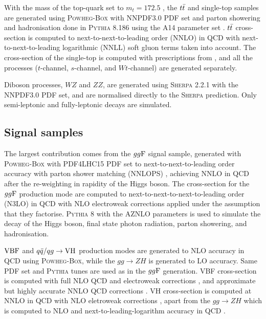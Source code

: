 With the mass of the top-quark set to $m_t = 172.5$ \GeV, the
$t\bar{t}$ and single-top samples are generated using
\textsc{Powheg-Box} \cite{powheg, Frixione_2007, Alioli_2010}
with NNPDF3.0 PDF set and parton showering and hadronisation
done in \textsc{Pythia} 8.186 using the A14 parameter set
\cite{ATL-PHYS-PUB-2014-021}. $t\bar{t}$ cross-section is
computed to next-to-next-to-leading order (NNLO) in
QCD with next-to-next-to-leading logarithmic
(NNLL) soft gluon terms taken into account. The cross-section
of the single-top is computed with prescriptions from
\cite{Kidonakis:2011wy, Kidonakis:2010ux}, and all the processes
($t$-channel, $s$-channel, and $Wt$-channel) are generated
separately.

Diboson processes, $WZ$ and $ZZ$, are generated using
\textsc{Sherpa} 2.2.1 with the NNPDF3.0 PDF set, and are normalised
directly to the \textsc{Sherpa} prediction. Only semi-leptonic
and fully-leptonic decays are simulated.

\subsection{Signal samples}

The largest contribution comes from the $gg\text{F}$ signal sample,
generated with \textsc{Powheg-Box} with PDF4LHC15 PDF set
to next-to-next-to-leading order accuracy with parton shower matching
(NNLOPS) \cite{Hamilton:2013fea}, achieving NNLO in QCD after
the re-weighting in rapidity of the Higgs boson. The cross-section
for the $gg\text{F}$ production mode are computed to
next-to-next-to-next-to-leading order (N3LO) \cite{Anastasiou:2016cez}
in QCD with NLO electroweak corrections applied
\cite{Aglietti:2004nj, Actis:2008ug} under the assumption that
they factorise. \textsc{Pythia} 8 with the AZNLO parameters
\cite{Aad:2014xaa} is used to simulate the decay
of the Higgs boson, final state photon radiation, parton
showering, and hadronisation. 

$\text{VBF}$ and $q\bar{q}/qg \rightarrow \text{VH}$ production modes are
generated to NLO accuracy in QCD using \textsc{Powheg-Box},
while the $gg \rightarrow ZH$ is generated to LO accuracy. Same
PDF set and \textsc{Pythia} tunes are used as in the $gg\text{F}$
generation. VBF cross-section is computed with full NLO QCD
and electroweak corrections \cite{Ciccolini:2007jr, Ciccolini:2007ec,
Arnold:2008rz}, and approximate but highly accurate NNLO QCD
corrections \cite{Bolzoni:2010xr}. VH cross-section is computed at
NNLO in QCD \cite{Brein:2003wg} with NLO eletroweak
corrections \cite{Ciccolini:2003jy}, apart from the
$gg \rightarrow ZH$ which is computed to NLO and next-to-leading-logarithm
accuracy in QCD \cite{Ciccolini:2003jy, Brein:2003wg, Brein:2011vx,
Altenkamp:2012sx, Denner:2014cla, Brein:2012ne, Harlander:2014wda,
Harlander:2018yio}.


